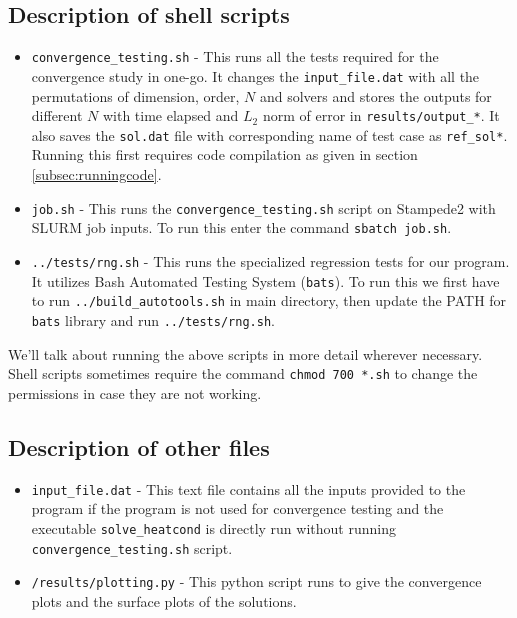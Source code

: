\documentclass[12pt]{amsart}   %
\begin{document}
\subsection{Description of shell scripts}
\begin{itemize}
    \item {\tt{convergence\_testing.sh}} - This runs all the tests required for the convergence study in one-go. It changes the {\tt{input\_file.dat}} with all the permutations of dimension, order, $N$ and solvers and stores the outputs for different $N$ with time elapsed and $L_2$ norm of error in {\tt{results/output\_*}}. It also saves the {\tt{sol.dat}} file with corresponding name of test case as {\tt{ref\_sol*}}. Running this first requires code compilation as given in section \ref{subsec:runningcode}.
    \item {\tt{job.sh}} - This runs the {\tt{convergence\_testing.sh}} script on Stampede2 with SLURM job inputs. To run this enter the command {\tt{sbatch job.sh}}.
    \item {\tt{../tests/rng.sh}} - This runs the specialized regression tests for our program. It utilizes Bash Automated Testing System ({\tt{bats}}). To run this we first have to run {\tt{../build\_autotools.sh}} in main directory, then update the PATH for {\tt{bats}} library and run {\tt{../tests/rng.sh}}.
\end{itemize}
We'll talk about running the above scripts in more detail wherever necessary. Shell scripts sometimes require the command {\tt{chmod 700 *.sh}} to change the permissions in case they are not working.

\subsection{Description of other files}
\begin{itemize}
    \item {\tt{input\_file.dat}} - This text file contains all the inputs provided to the program if the program is not used for convergence testing and the executable {\tt{solve_heatcond}} is directly run without running {\tt{convergence\_testing.sh}} script.
    \item {\tt{/results/plotting.py}} - This python script runs to give the convergence plots and the surface plots of the solutions.
    \end{itemize}
\end{document}
